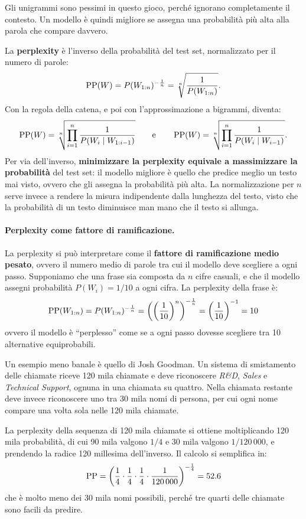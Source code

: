 Gli unigrammi sono pessimi in questo gioco, perché ignorano completamente il contesto. Un modello è quindi migliore se assegna una probabilità più alta alla parola che compare davvero.

La \textbf{perplexity} è l'inverso della probabilità del test set, normalizzato per il numero di parole:
\begin{equation}
\operatorname{PP}(W) = P(W_{1:n})^{-\frac{1}{n}} = \sqrt[n]{\frac{1}{P(W_{1:n})}}.
\end{equation}
Con la regola della catena, e poi con l'approssimazione a bigrammi, diventa:
\begin{equation}
\operatorname{PP}(W) = \sqrt[n]{\prod_{i=1}^{n} \frac{1}{P(W_i \mid W_{1:i-1})}} \qquad \text{e} \qquad \operatorname{PP}(W) = \sqrt[n]{\prod_{i=1}^{n} \frac{1}{P(W_i \mid W_{i-1})}}.
\end{equation}
Per via dell'inverso, \textbf{minimizzare la perplexity equivale a massimizzare la probabilità} del test set: il modello migliore è quello che predice meglio un testo mai visto, ovvero che gli assegna la probabilità più alta. La normalizzazione per $n$ serve invece a rendere la misura indipendente dalla lunghezza del testo, visto che la probabilità di un testo diminuisce man mano che il testo si allunga.

\paragraph{Perplexity come fattore di ramificazione.} La perplexity si può interpretare come il \textbf{fattore di ramificazione medio pesato}, ovvero il numero medio di parole tra cui il modello deve scegliere a ogni passo. Supponiamo che una frase sia composta da $n$ cifre casuali, e che il modello assegni probabilità $P(W_i) = 1/10$ a ogni cifra. La perplexity della frase è:
\[
\operatorname{PP}(W_{1:n}) = P(W_{1:n})^{-\frac{1}{n}} = \left(\left(\frac{1}{10}\right)^{n}\right)^{-\frac{1}{n}} = \left(\frac{1}{10}\right)^{-1} = 10
\]
ovvero il modello è \enquote{perplesso} come se a ogni passo dovesse scegliere tra 10 alternative equiprobabili.

Un esempio meno banale è quello di Josh Goodman. Un sistema di smistamento delle chiamate riceve 120 mila chiamate e deve riconoscere \textit{R\&D}, \textit{Sales} e \textit{Technical Support}, ognuna in una chiamata su quattro. Nella chiamata restante deve invece riconoscere uno tra 30 mila nomi di persona, per cui ogni nome compare una volta sola nelle 120 mila chiamate.

La perplexity della sequenza di 120 mila chiamate si ottiene moltiplicando 120 mila probabilità, di cui 90 mila valgono $1/4$ e 30 mila valgono $1/120\,000$, e prendendo la radice 120 millesima dell'inverso. Il calcolo si semplifica in:
\[
\operatorname{PP} = \left(\frac{1}{4} \cdot \frac{1}{4} \cdot \frac{1}{4} \cdot \frac{1}{120\,000}\right)^{-\frac{1}{4}} = 52.6
\]
che è molto meno dei 30 mila nomi possibili, perché tre quarti delle chiamate sono facili da predire.

